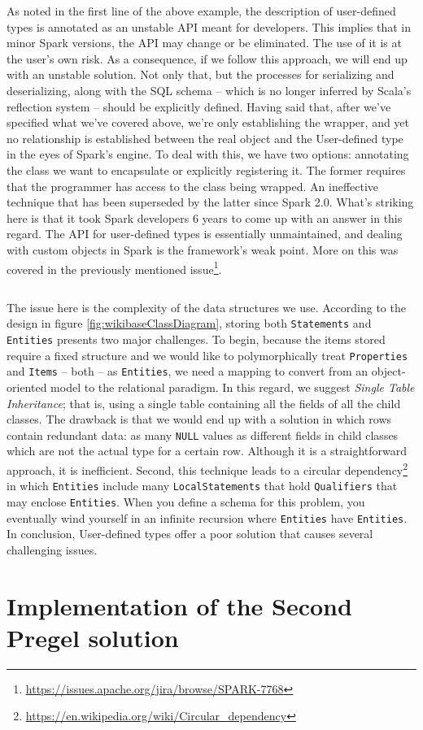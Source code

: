 As noted in the first line of the above example, the description of user-defined types is annotated as an unstable API meant for developers. This implies that in minor Spark versions, the API may change or be eliminated. The use of it is at the user's own risk. As a consequence, if we follow this approach, we will end up with an unstable solution. Not only that, but the processes for serializing and deserializing, along with the SQL schema -- which is no longer inferred by Scala's reflection system -- should be explicitly defined. Having said that, after we've specified what we've covered above, we're only establishing the wrapper, and yet no relationship is established between the real object and the User-defined type in the eyes of Spark's engine. To deal with this, we have two options: annotating the class we want to encapsulate or explicitly registering it. The former requires that the programmer has access to the class being wrapped. An ineffective technique that has been superseded by the latter since Spark 2.0. What's striking here is that it took Spark developers 6 years to come up with an answer in this regard. The API for user-defined types is essentially unmaintained, and dealing with custom objects in Spark is the framework's weak point. More on this was covered in the previously mentioned issue\footnote{\url{https://issues.apache.org/jira/browse/SPARK-7768}}.

\begin{code}
    \inputminted{scala}{code/listings/8-2_udtRegistration.scala}
\end{code}

The issue here is the complexity of the data structures we use. According to the design in figure \ref{fig:wikibaseClassDiagram}, storing both \texttt{Statements} and \texttt{Entities} presents two major challenges. To begin, because the items stored require a fixed structure and we would like to polymorphically treat \texttt{Properties} and \texttt{Items} -- both -- as \texttt{Entities}, we need a mapping to convert from an object-oriented model to the relational paradigm. In this regard, we suggest \textit{Single Table Inheritance}; that is, using a single table containing all the fields of all the child classes. The drawback is that we would end up with a solution in which rows contain redundant data: as many \texttt{NULL} values as different fields in child classes which are not the actual type for a certain row. Although it is a straightforward approach, it is inefficient. Second, this technique leads to a circular dependency\footnote{\url{https://en.wikipedia.org/wiki/Circular_dependency}} in which \texttt{Entities} include many \texttt{LocalStatements} that hold \texttt{Qualifiers} that may enclose \texttt{Entities}. When you define a schema for this problem, you eventually wind yourself in an infinite recursion where \texttt{Entities} have \texttt{Entities}. In conclusion, User-defined types offer a poor solution that causes several challenging issues.

\section{Implementation of the Second Pregel solution}